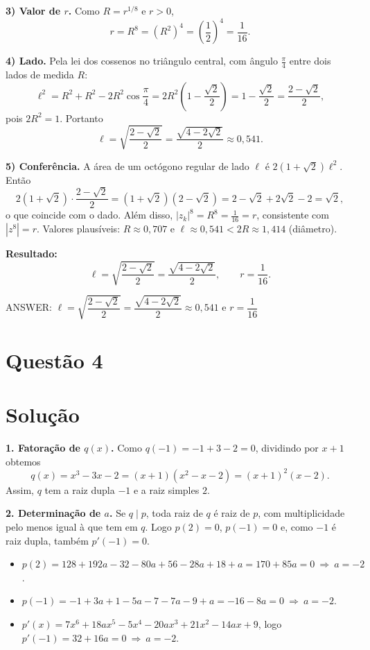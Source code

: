 \documentclass{article}%
\begin{document}
\textbf{3) Valor de $r$.} Como $R=r^{1/8}$ e $r>0$,
\[
r=R^8=\left(R^2\right)^4=\left(\frac12\right)^4=\frac1{16}.
\]

\textbf{4) Lado.} Pela lei dos cossenos no triângulo central, com ângulo $\frac{\pi}{4}$ entre dois lados de medida $R$:
\[
\ell^2=R^2+R^2-2R^2\cos\frac{\pi}{4}=2R^2\left(1-\frac{\sqrt2}{2}\right)=1-\frac{\sqrt2}{2}=\frac{2-\sqrt2}{2},
\]
pois $2R^2=1$. Portanto
\[
\ell=\sqrt{\frac{2-\sqrt2}{2}}=\frac{\sqrt{4-2\sqrt2}}{2}\approx 0{,}541 .
\]

\textbf{5) Conferência.} A área de um octógono regular de lado $\ell$ é $2(1+\sqrt2)\ell^2$. Então
\[
2(1+\sqrt2)\cdot\frac{2-\sqrt2}{2}=(1+\sqrt2)(2-\sqrt2)=2-\sqrt2+2\sqrt2-2=\sqrt2,
\]
o que coincide com o dado. Além disso, $|z_k|^8=R^8=\frac1{16}=r$, consistente com $|z^8|=r$. Valores plausíveis: $R\approx0{,}707$ e $\ell\approx 0{,}541<2R\approx1{,}414$ (diâmetro).

\textbf{Resultado:}
\[
\ell=\sqrt{\frac{2-\sqrt2}{2}}=\frac{\sqrt{4-2\sqrt2}}{2},\qquad r=\frac1{16}.
\]

ANSWER: $\ell=\sqrt{\dfrac{2-\sqrt2}{2}}=\dfrac{\sqrt{4-2\sqrt2}}{2}\approx 0{,}541$ e $r=\dfrac1{16}$%
\newpage%
\section*{Questão 4}

\section*{Solução}

\textbf{1. Fatoração de $q(x)$.} Como $q(-1)=-1+3-2=0$, dividindo por $x+1$ obtemos
\[
q(x)=x^3-3x-2=(x+1)(x^2-x-2)=(x+1)^2(x-2).
\]
Assim, $q$ tem a raiz dupla $-1$ e a raiz simples $2$.

\textbf{2. Determinação de $a$.} Se $q\mid p$, toda raiz de $q$ é raiz de $p$, com multiplicidade pelo menos igual à que tem em $q$. Logo $p(2)=0$, $p(-1)=0$ e, como $-1$ é raiz dupla, também $p'(-1)=0$.

\begin{itemize}
\item $p(2)=128+192a-32-80a+56-28a+18+a=170+85a=0\ \Rightarrow\ a=-2$.
\item $p(-1)=-1+3a+1-5a-7-7a-9+a=-16-8a=0\ \Rightarrow\ a=-2$.
\item $p'(x)=7x^6+18ax^5-5x^4-20ax^3+21x^2-14ax+9$, logo $p'(-1)=32+16a=0\ \Rightarrow\ a=-2$.
\end{itemize}
\end{document}
